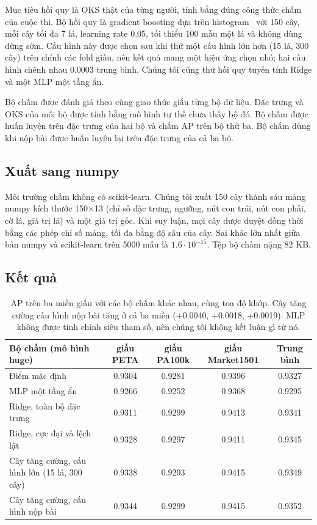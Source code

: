 \documentclass[11pt,a4paper]{article}
\begin{document}
Mục tiêu hồi quy là OKS thật của từng người, tính bằng đúng công thức chấm của cuộc thi. Bộ hồi quy là gradient boosting dựa trên histogram~\cite{friedman,lightgbm} với 150 cây, mỗi cây tối đa 7 lá, learning rate 0.05, tối thiểu 100 mẫu một lá và không dùng dừng sớm. Cấu hình này được chọn sau khi thử một cấu hình lớn hơn (15 lá, 300 cây) trên chính các fold giấu, nên kết quả mang một hiệu ứng chọn nhỏ; hai cấu hình chênh nhau 0.0003 trung bình. Chúng tôi cũng thử hồi quy tuyến tính Ridge và một MLP một tầng ẩn.

Bộ chấm được đánh giá theo cùng giao thức giấu từng bộ dữ liệu. Đặc trưng và OKS của mỗi bộ được tính bằng mô hình tư thế chưa thấy bộ đó. Bộ chấm được huấn luyện trên đặc trưng của hai bộ và chấm AP trên bộ thứ ba. Bộ chấm dùng khi nộp bài được huấn luyện lại trên đặc trưng của cả ba bộ.

\subsection{Xuất sang numpy}

Môi trường chấm không có scikit-learn. Chúng tôi xuất 150 cây thành sáu mảng numpy kích thước 150×13 (chỉ số đặc trưng, ngưỡng, nút con trái, nút con phải, cờ lá, giá trị lá) và một giá trị gốc. Khi suy luận, mọi cây được duyệt đồng thời bằng các phép chỉ số mảng, tối đa bằng độ sâu của cây. Sai khác lớn nhất giữa bản numpy và scikit-learn trên 5000 mẫu là $1.6\cdot10^{-15}$. Tệp bộ chấm nặng 82 KB.

\subsection{Kết quả}

\begin{table}[H]
\centering\small
\begin{tabular}{@{}lcccc@{}}
\toprule
Bộ chấm (mô hình huge) & giấu PETA & giấu PA100k & giấu Market1501 & Trung bình \\
\midrule
Điểm mặc định & 0.9304 & 0.9281 & 0.9396 & 0.9327 \\
MLP một tầng ẩn & 0.9266 & 0.9252 & 0.9368 & 0.9295 \\
Ridge, toàn bộ đặc trưng & 0.9311 & 0.9299 & 0.9413 & 0.9341 \\
Ridge, cực đại và lệch lật & 0.9328 & 0.9297 & 0.9411 & 0.9345 \\
Cây tăng cường, cấu hình lớn (15 lá, 300 cây) & 0.9338 & 0.9293 & 0.9415 & 0.9349 \\
Cây tăng cường, cấu hình nộp bài & 0.9344 & 0.9299 & 0.9415 & 0.9352 \\
\bottomrule
\end{tabular}
\caption{AP trên ba miền giấu với các bộ chấm khác nhau, cùng toạ độ khớp. Cây tăng cường cấu hình nộp bài tăng ở cả ba miền (+0.0040, +0.0018, +0.0019). MLP không được tinh chỉnh siêu tham số, nên chúng tôi không kết luận gì từ nó.}
\label{tab:rescore}
\end{table}
\end{document}
